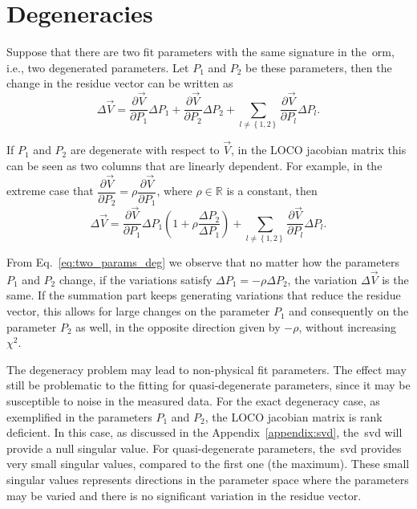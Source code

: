 \section{Degeneracies}\label{sec:degeneracy}
Suppose that there are two fit parameters with the same signature in the~\gls{orm}, i.e., two degenerated parameters. Let $P_1$ and $P_2$ be these parameters, then the change in the residue vector can be written as
\begin{equation}
\Delta \vec{V} = \dfrac{\partial \vec{V}}{\partial P_{1}} \Delta P_{1} + \dfrac{\partial \vec{V}}{\partial P_{2}} \Delta P_{2} + \sum_{l \neq \left\{1,2\right\}}\dfrac{\partial \vec{V}}{\partial P_{l}} \Delta P_{l}.
\end{equation}

If $P_1$ and $P_2$ are degenerate with respect to $\vec{V}$, in the LOCO jacobian matrix this can be seen as two columns that are linearly dependent. For example, in the extreme case that $\dfrac{\partial \vec{V}}{\partial P_{2}} = \rho \dfrac{\partial \vec{V}}{\partial P_{1}}$, where $\rho \in \mathbb{R}$ is a constant, then 
\begin{equation}
\Delta \vec{V} = \dfrac{\partial \vec{V}}{\partial P_{1}} \Delta P_{1}\left(1 + \rho \dfrac{\Delta P_2}{\Delta P_1}\right) + \sum_{l \neq \left\{1,2\right\}}\dfrac{\partial \vec{V}}{\partial P_{l}} \Delta P_{l}.
\label{eq:two_params_deg}
\end{equation}

From Eq.~\eqref{eq:two_params_deg} we observe that no matter how the parameters $P_1$ and $P_2$ change, if the variations satisfy $\Delta P_1 = - \rho \Delta P_2$, the variation $\Delta \vec{V}$ is the same. If the summation part keeps generating variations that reduce the residue vector, this allows for large changes on the parameter $P_1$ and consequently on the parameter $P_2$ as well, in the opposite direction given by $-\rho$, without increasing $\chi^2$.

The degeneracy problem may lead to non-physical fit parameters. The effect may still be problematic to the fitting for quasi-degenerate parameters, since it may be susceptible to noise in the measured data. For the exact degeneracy case, as exemplified in the parameters $P_1$ and $P_2$, the LOCO jacobian matrix is rank deficient. In this case, as discussed in the Appendix~\ref{appendix:svd}, the~\gls{svd} will provide a null singular value. For quasi-degenerate parameters, the~\gls{svd} provides very small singular values, compared to the first one (the maximum). These small singular values represents directions in the parameter space where the parameters may be varied and there is no significant variation in the residue vector. 

